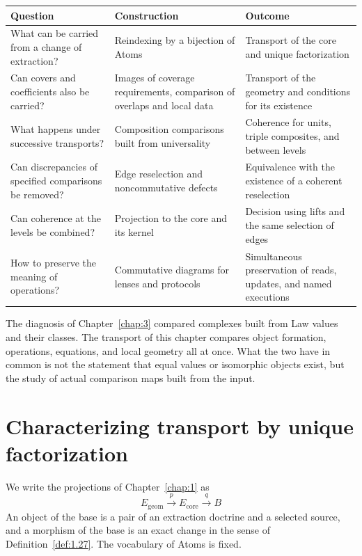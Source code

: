 \begin{xltabular}{\linewidth}{@{}LLL@{}}
\toprule
Question & Construction & Outcome \\
\midrule
\endhead
What can be carried from a change of extraction? & Reindexing by a bijection of Atoms & Transport of the core and unique factorization \\
\addlinespace[3pt]
Can covers and coefficients also be carried? & Images of coverage requirements, comparison of overlaps and local data & Transport of the geometry and conditions for its existence \\
\addlinespace[3pt]
What happens under successive transports? & Composition comparisons built from universality & Coherence for units, triple composites, and between levels \\
\addlinespace[3pt]
Can discrepancies of specified comparisons be removed? & Edge reselection and noncommutative defects & Equivalence with the existence of a coherent reselection \\
\addlinespace[3pt]
Can coherence at the levels be combined? & Projection to the core and its kernel & Decision using lifts and the same selection of edges \\
\addlinespace[3pt]
How to preserve the meaning of operations? & Commutative diagrams for lenses and protocols & Simultaneous preservation of reads, updates, and named executions \\
\bottomrule
\end{xltabular}

The diagnosis of Chapter~\ref{chap:3} compared complexes built from Law values and their
classes. The transport of this chapter compares object formation, operations, equations, and
local geometry all at once. What the two have in common is not the statement that equal
values or isomorphic objects exist, but the study of actual comparison maps built from the
input.

\section{Characterizing transport by unique factorization}\label{sec:4.1}

We write the projections of Chapter~\ref{chap:1} as
\begin{equation*}
E_{\mathrm{geom}}\xrightarrow{p}E_{\mathrm{core}}
\xrightarrow{q}B
\tag{4.1}\label{eq:4.1}
\end{equation*}
An object of the base is a pair of an extraction doctrine and a selected source, and a
morphism of the base is an exact change in the sense of Definition~\ref{def:1.27}. The
vocabulary of Atoms is fixed.

